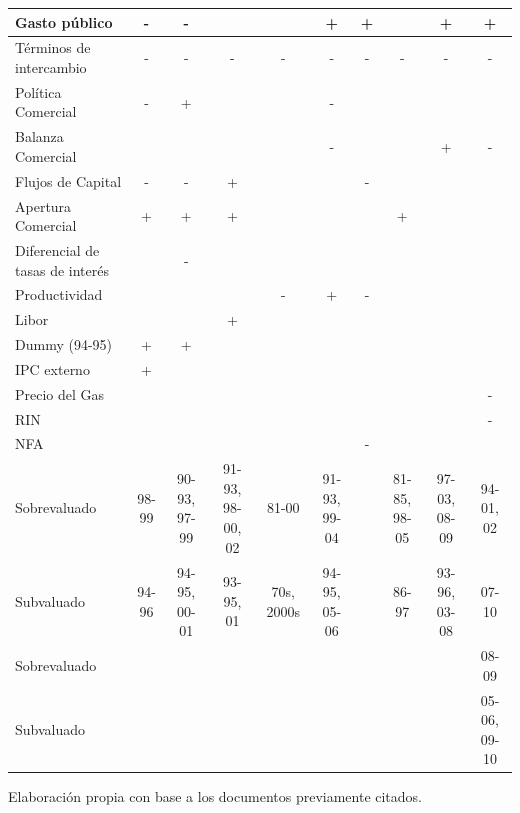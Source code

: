 \documentclass[12pt,letterpaper]{article}
\begin{document}
\begin{table}
\begin{center}
\begin{threeparttable}
{\begin{tabular}{lccccccccc}
\hline
 Gasto público	&	-	&	-	&		&		&	+	&	+	&		&	+	&	+	\\
\hline
 Términos de intercambio	&	-	&	-	&	-	&	-	&	-	&	-	&	-	&	-	&	-	\\
\hline
 Política Comercial	&	-	&	+	&		&		&	-	&		&		&		&		\\
\hline
 Balanza Comercial	&		&		&		&		&	-	&		&		&	+	&	-	\\
\hline
 Flujos de Capital	&	-	&	-	&	+	&		&		&	-	&		&		&		\\
\hline
 Apertura Comercial	&	+	&	+	&	+	&		&		&		&	+	&		&		\\
\hline
 Diferencial de tasas de interés	&		&	-	&		&		&		&		&		&		&		\\
\hline
 Productividad	&		&		&		&	-	&	+	&	-	&		&		&		\\
\hline
 Libor	&		&		&	+	&		&		&		&		&		&		\\
\hline
 Dummy (94-95)	&	+	&	+	&		&		&		&		&		&		&		\\
\hline
 IPC externo	&	+	&		&		&		&		&		&		&		&		\\
\hline
 Precio del Gas	&		&		&		&		&		&		&		&		&	-	\\
\hline
 RIN	&		&		&		&		&		&		&		&		&	-	\\
\hline
 NFA	&		&		&		&		&		&	-	&		&		&		\\
\hline
Sobrevaluado	&	 98-99	&	 90-93, 97-99	&	 91-93, 98-00, 02	&	 81-00	&	 91-93, 99-04	&		&	 81-85, 98-05	&	 97-03, 08-09	&	 94-01, 02	\\
Subvaluado	&	 94-96	&	 94-95, 00-01	&	 93-95, 01	&	 70s, 2000s	&	 94-95, 05-06	&		&	 86-97	&	 93-96, 03-08	&	 07-10	\\
Sobrevaluado	&		&		&		&		&		&		&		&		&	 08-09	\\
Subvaluado	&		&		&		&		&		&		&		&		&	 05-06, 09-10	\\
\hline
\hline
\end{tabular}
}
\begin{tablenotes}
\small
 \item  Elaboración propia con base a los documentos previamente citados.
\end{tablenotes}
\end{threeparttable}					
\end{center}
\label{otros}	
\end{table}	
\end{document}

